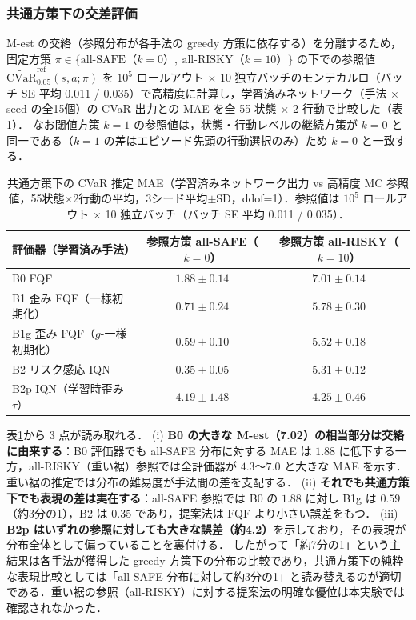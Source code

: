 \documentclass[a4paper,10pt]{jsarticle}
\theoremstyle{definition}
\begin{document}
\subsubsection{共通方策下の交差評価}
\label{subsec:cross}
M-est の交絡（参照分布が各手法の greedy 方策に依存する）を分離するため，固定方策 $\pi\in\{\text{all-SAFE}（k=0）,\ \text{all-RISKY}（k=10）\}$ の下での参照値 $\widetilde{\mathrm{CVaR}}_{0.05}^{\mathrm{ref}}(s,a;\pi)$ を $10^5$ ロールアウト $\times$ 10 独立バッチのモンテカルロ（バッチ SE 平均 0.011 / 0.035）で高精度に計算し，学習済みネットワーク（手法 $\times$ seed の全15個）の CVaR 出力との MAE を全 55 状態 $\times$ 2 行動で比較した（表\ref{tab:B2}）．
なお閾値方策 $k=1$ の参照値は，状態・行動レベルの継続方策が $k=0$ と同一である（$k=1$ の差はエピソード先頭の行動選択のみ）ため $k=0$ と一致する．

\begin{table}[htbp]
\centering
\caption{共通方策下の CVaR 推定 MAE（学習済みネットワーク出力 vs 高精度 MC 参照値，55状態$\times$2行動の平均，3シード平均$\pm$SD，ddof=1）．参照値は $10^5$ ロールアウト $\times$ 10 独立バッチ（バッチ SE 平均 0.011 / 0.035）．}
\label{tab:B2}
\small
\setlength{\tabcolsep}{4pt}
\begin{tabular}{lcc}
\toprule
評価器（学習済み手法） & 参照方策 all-SAFE（$k=0$） & 参照方策 all-RISKY（$k=10$）\\
\midrule
B0 FQF & $1.88\pm0.14$ & $7.01\pm0.14$\\
B1 歪み FQF（一様初期化） & $0.71\pm0.24$ & $5.78\pm0.30$\\
B1g 歪み FQF（$g$-一様初期化） & $0.59\pm0.10$ & $5.52\pm0.18$\\
B2 リスク感応 IQN & $\mathbf{0.35\pm0.05}$ & $5.31\pm0.12$\\
B2p IQN（学習時歪み $\tau$） & $4.19\pm1.48$ & $4.25\pm0.46$\\
\bottomrule
\end{tabular}
\end{table}

表\ref{tab:B2}から 3 点が読み取れる．
(i) \textbf{B0 の大きな M-est（7.02）の相当部分は交絡に由来する}：B0 評価器でも all-SAFE 分布に対する MAE は $1.88$ に低下する一方，all-RISKY（重い裾）参照では全評価器が $4.3$〜$7.0$ と大きな MAE を示す．重い裾の推定では分布の難易度が手法間の差を支配する．
(ii) \textbf{それでも共通方策下でも表現の差は実在する}：all-SAFE 参照では B0 の $1.88$ に対し B1g は $0.59$（約3分の1），B2 は $0.35$ であり，提案法は FQF より小さい誤差をもつ．
(iii) \textbf{B2p はいずれの参照に対しても大きな誤差（約4.2）}を示しており，その表現が分布全体として偏っていることを裏付ける．
したがって「約7分の1」という主結果は各手法が獲得した greedy 方策下の分布の比較であり，共通方策下の純粋な表現比較としては「all-SAFE 分布に対して約3分の1」と読み替えるのが適切である．重い裾の参照（all-RISKY）に対する提案法の明確な優位は本実験では確認されなかった．
\end{document}
